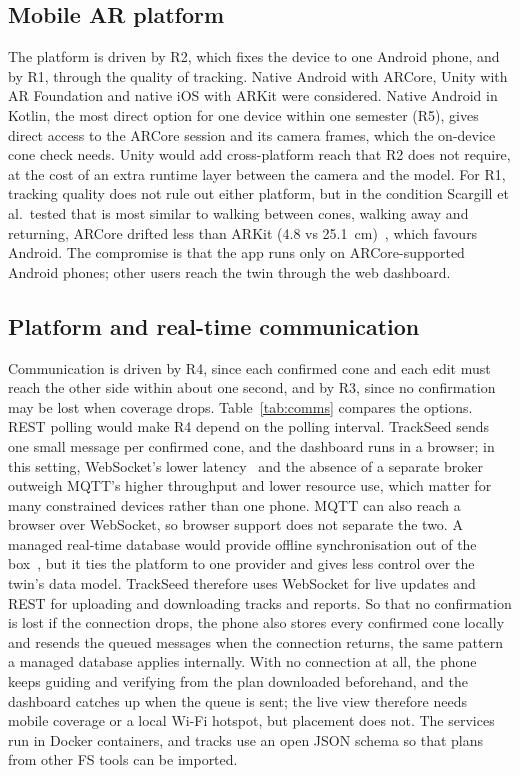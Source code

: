 \subsection{Mobile AR platform}
The platform is driven by R2, which fixes the device to one Android phone, and by R1, through the quality of tracking. Native Android with ARCore, Unity with AR Foundation and native iOS with ARKit were considered. Native Android in Kotlin, the most direct option for one device within one semester (R5), gives direct access to the ARCore session and its camera frames, which the on-device cone check needs. Unity would add cross-platform reach that R2 does not require, at the cost of an extra runtime layer between the camera and the model. For R1, tracking quality does not rule out either platform, but in the condition Scargill et al.\ tested that is most similar to walking between cones, walking away and returning, ARCore drifted less than ARKit (4.8 vs 25.1~cm)~\cite{scargill2021}, which favours Android. The compromise is that the app runs only on ARCore-supported Android phones; other users reach the twin through the web dashboard.

\subsection{Platform and real-time communication}
Communication is driven by R4, since each confirmed cone and each edit must reach the other side within about one second, and by R3, since no confirmation may be lost when coverage drops. Table~\ref{tab:comms} compares the options. REST polling would make R4 depend on the polling interval. TrackSeed sends one small message per confirmed cone, and the dashboard runs in a browser; in this setting, WebSocket's lower latency~\cite{ajayi2023} and the absence of a separate broker outweigh MQTT's higher throughput and lower resource use, which matter for many constrained devices rather than one phone. MQTT can also reach a browser over WebSocket, so browser support does not separate the two. A managed real-time database would provide offline synchronisation out of the box~\cite{firebaseoffline}, but it ties the platform to one provider and gives less control over the twin's data model. TrackSeed therefore uses WebSocket for live updates and REST for uploading and downloading tracks and reports. So that no confirmation is lost if the connection drops, the phone also stores every confirmed cone locally and resends the queued messages when the connection returns, the same pattern a managed database applies internally. With no connection at all, the phone keeps guiding and verifying from the plan downloaded beforehand, and the dashboard catches up when the queue is sent; the live view therefore needs mobile coverage or a local Wi-Fi hotspot, but placement does not. The services run in Docker containers, and tracks use an open JSON schema so that plans from other FS tools can be imported.

